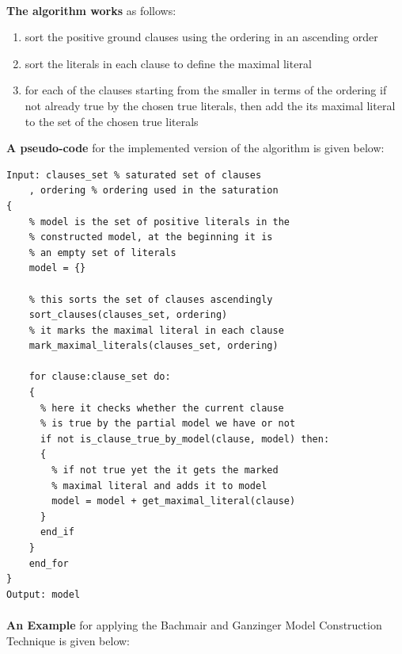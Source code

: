 		\paragraph{}
		\textbf{The algorithm works} as follows:
			
			\begin{enumerate}
				\item sort the positive ground clauses using the ordering in an ascending order
				\item sort the literals in each clause to define the maximal literal
				\item for each of the clauses starting from the smaller in terms of the ordering if not already true by the chosen true literals, then add the its maximal literal to the set of the chosen true literals 
			\end{enumerate}
		
		\textbf{A pseudo-code} for the implemented version of the algorithm is given below:
		
			\begin{minipage}{\textwidth}		
			\begin{lstlisting}[caption=Ground Positive Case for Bachmair and Ganzinger Model Construction,frame=single]
Input: clauses_set % saturated set of clauses
	, ordering % ordering used in the saturation
{	
	% model is the set of positive literals in the 
	% constructed model, at the beginning it is
	% an empty set of literals 
	model = {}			
				
	% this sorts the set of clauses ascendingly
	sort_clauses(clauses_set, ordering)  
	% it marks the maximal literal in each clause			
	mark_maximal_literals(clauses_set, ordering)
		
	for clause:clause_set do:
	{
	  % here it checks whether the current clause
	  % is true by the partial model we have or not
	  if not is_clause_true_by_model(clause, model) then:
	  {
		% if not true yet the it gets the marked
		% maximal literal and adds it to model											
		model = model + get_maximal_literal(clause)				
	  }
	  end_if
	}
	end_for						
}
Output: model
			\end{lstlisting}
			\end{minipage}		
		
		
		\paragraph{}
		\textbf{An Example} for applying the Bachmair and Ganzinger Model Construction Technique is given below:

